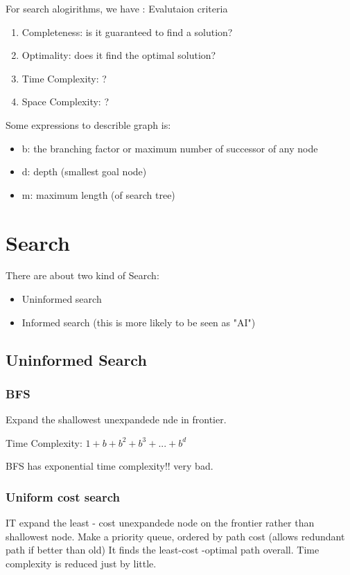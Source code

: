 \documentclass[9pt]{article}
\begin{document}
For search alogirithms, we have :
\huge{Evalutaion criteria}
\begin{enumerate}
  \item Completeness: is it guaranteed to find a solution?
  \item Optimality: does it find the optimal solution?
  \item Time Complexity: ?
  \item Space Complexity: ?
\end{enumerate}
Some expressions to describle graph is:
\begin{itemize}
  \item b: the branching factor or maximum number of successor of any node
  \item d: depth (smallest goal node)
  \item m: maximum length (of search tree)
\end{itemize}
\section{Search}

There are about two kind of Search:
\begin{itemize}
  \item Uninformed search
  \item Informed search (this is more likely to be seen as "AI")
\end{itemize}

\subsection{Uninformed Search}
\subsubsection{BFS}
Expand the shallowest unexpandede nde in frontier.

Time Complexity: $1+b+b^2+b^3+...+b^{d}$

BFS has exponential time complexity!! very bad.

\subsubsection{Uniform cost search}



IT expand the least - cost unexpandede node on the frontier rather than shallowest node.
Make a priority queue, ordered by path cost (allows redundant path if better than old)
It finds the least-cost -optimal path overall.
Time complexity is reduced just by little.
\end{document}
